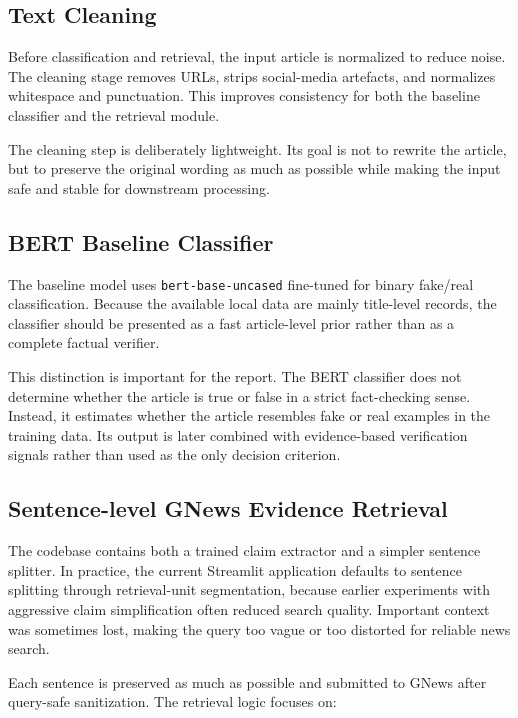 \documentclass[11pt]{article}
\newcommand{\code}[1]{\texttt{#1}}
\begin{document}
\subsection{Text Cleaning}

Before classification and retrieval, the input article is normalized to reduce
noise. The cleaning stage removes URLs, strips social-media artefacts, and
normalizes whitespace and punctuation. This improves consistency for both the
baseline classifier and the retrieval module.

The cleaning step is deliberately lightweight. Its goal is not to rewrite the
article, but to preserve the original wording as much as possible while making
the input safe and stable for downstream processing.

\subsection{BERT Baseline Classifier}

The baseline model uses \code{bert-base-uncased} fine-tuned for binary fake/real
classification. Because the available local data are mainly title-level records,
the classifier should be presented as a fast article-level prior rather than as
a complete factual verifier.

This distinction is important for the report. The BERT classifier does not
determine whether the article is true or false in a strict fact-checking sense.
Instead, it estimates whether the article resembles fake or real examples in the
training data. Its output is later combined with evidence-based verification
signals rather than used as the only decision criterion.

\subsection{Sentence-level GNews Evidence Retrieval}

The codebase contains both a trained claim extractor and a simpler sentence
splitter. In practice, the current Streamlit application defaults to sentence
splitting through retrieval-unit segmentation, because earlier experiments with
aggressive claim simplification often reduced search quality. Important context
was sometimes lost, making the query too vague or too distorted for reliable
news search.

Each sentence is preserved as much as possible and submitted to GNews after
query-safe sanitization. The retrieval logic focuses on:
\end{document}
